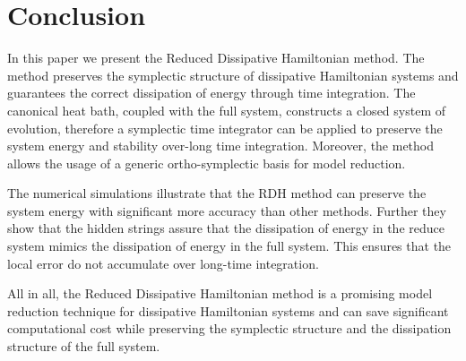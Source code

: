 \section{Conclusion} \label{sec:5}

In this paper we present the Reduced Dissipative Hamiltonian method. The method preserves the symplectic structure of dissipative Hamiltonian systems and guarantees the correct dissipation of energy through time integration. The canonical heat bath, coupled with the full system, constructs a closed system of evolution, therefore a symplectic time integrator can be applied to preserve the system energy and stability over-long time integration. Moreover, the method allows the usage of a generic ortho-symplectic basis for model reduction.

The numerical simulations illustrate that the RDH method can preserve the system energy with significant more accuracy than other methods. Further they show that the hidden strings assure that the dissipation of energy in the reduce system mimics the dissipation of energy in the full system. This ensures that the local error do not accumulate over long-time integration.

All in all, the Reduced Dissipative Hamiltonian method is a promising model reduction technique for dissipative Hamiltonian systems and can save significant computational cost while preserving the symplectic structure and the dissipation structure of the full system.
